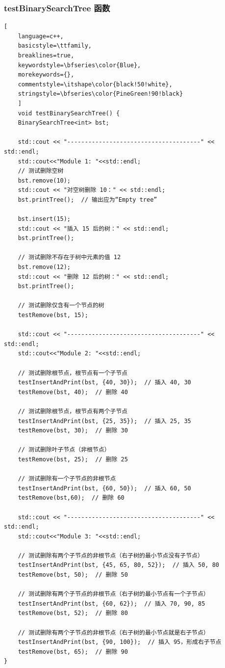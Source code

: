 \documentclass[UTF8]{ctexart}
\begin{document}
\subsubsection{testBinarySearchTree 函数}
\begin{lstlisting}[ 
    language=c++,
    basicstyle=\ttfamily,
    breaklines=true,
    keywordstyle=\bfseries\color{Blue}, 
    morekeywords={}, 
    commentstyle=\itshape\color{black!50!white},
    stringstyle=\bfseries\color{PineGreen!90!black} 
    ]
    void testBinarySearchTree() {
    BinarySearchTree<int> bst;

    std::cout << "--------------------------------------" << std::endl;
    std::cout<<"Module 1: "<<std::endl;
    // 测试删除空树
    bst.remove(10);
    std::cout << "对空树删除 10：" << std::endl;
    bst.printTree();  // 输出应为“Empty tree”

    bst.insert(15);
    std::cout << "插入 15 后的树：" << std::endl;
    bst.printTree();  

    // 测试删除不存在于树中元素的值 12
    bst.remove(12);
    std::cout << "删除 12 后的树：" << std::endl;
    bst.printTree();

    // 测试删除仅含有一个节点的树
    testRemove(bst, 15);
    
    std::cout << "--------------------------------------" << std::endl;
    std::cout<<"Module 2: "<<std::endl;

    // 测试删除根节点，根节点有一个子节点
    testInsertAndPrint(bst, {40, 30});  // 插入 40, 30
    testRemove(bst, 40);  // 删除 40

    // 测试删除根节点，根节点有两个子节点
    testInsertAndPrint(bst, {25, 35});  // 插入 25, 35
    testRemove(bst, 30);  // 删除 30

    // 测试删除叶子节点（非根节点）
    testRemove(bst, 25);  // 删除 25

    // 测试删除有一个子节点的非根节点
    testInsertAndPrint(bst, {60, 50});  // 插入 60, 50
    testRemove(bst,60);  // 删除 60

    std::cout << "--------------------------------------" << std::endl;
    std::cout<<"Module 3: "<<std::endl;

    // 测试删除有两个子节点的非根节点（右子树的最小节点没有子节点）
    testInsertAndPrint(bst, {45, 65, 80, 52});  // 插入 50, 80
    testRemove(bst, 50);  // 删除 50

    // 测试删除有两个子节点的非根节点（右子树的最小节点有一个子节点）
    testInsertAndPrint(bst, {60, 62});  // 插入 70, 90, 85
    testRemove(bst, 52);  // 删除 80

    // 测试删除有两个子节点的非根节点（右子树的最小节点就是右子节点）
    testInsertAndPrint(bst, {90, 100});  // 插入 95，形成右子节点
    testRemove(bst, 65);  // 删除 90
}
\end{lstlisting}
\end{document}
